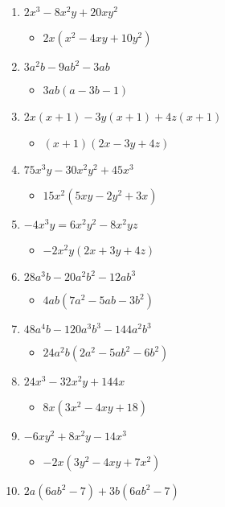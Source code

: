 \begin{enumerate}
\begin{itemize}
  \end{itemize}
\item $2x^{3} - 8x^{2}y + 20xy^{2}$
  \begin{itemize}
  \item $2x(x^{2}-4xy+10y^{2})$
  \end{itemize}
\item $3a^{2}b - 9ab^{2} - 3ab$
  \begin{itemize}
  \item $3ab(a-3b-1)$
  \end{itemize}
\item $2x(x+1) - 3y(x+1) + 4z(x+1)$
  \begin{itemize}
  \item $(x+1)(2x-3y+4z)$
  \end{itemize}
\item $75x^{3}y - 30x^{2}y^{2} + 45x^{3}$
  \begin{itemize}
  \item $15x^{2}(5xy-2y^{2}+3x)$
  \end{itemize}
\item $-4x^{3}y = 6x^{2}y^{2} - 8x^{2}yz$
  \begin{itemize}
  \item $-2x^{2}y(2x+3y+4z)$
  \end{itemize}
\item $28a^{3}b - 20a^{2}b^{2} - 12ab^{3}$
  \begin{itemize}
  \item $4ab(7a^{2}-5ab-3b^{2})$
  \end{itemize}
\item $48a^{4}b - 120a^{3}b^{3} - 144a^{2}b^{3}$
  \begin{itemize}
  \item $24a^{2}b(2a^{2}-5ab^{2}-6b^{2})$
  \end{itemize}
\item $24x^{3} - 32x^{2}y + 144x$
  \begin{itemize}
  \item $8x(3x^{2}-4xy+18)$
  \end{itemize}
\item $-6xy^{2} + 8x^{2}y - 14x^{3}$
  \begin{itemize}
  \item $-2x(3y^{2}-4xy+7x^{2})$
  \end{itemize}
\item $2a(6ab^{2}-7) + 3b(6ab^{2}-7)$

\end{enumerate}
